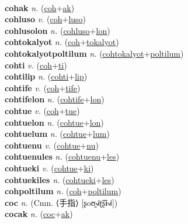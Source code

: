  \label{coh} \\
\textbf{cohak} \textit{n.} (\hyperref[coh]{coh}+\hyperref[ak]{ak})
 \label{cohak} \\
\textbf{cohluso} \textit{v.} (\hyperref[coh]{coh}+\hyperref[luso]{luso})
 \label{cohluso} \\
\textbf{cohlusolon} \textit{n.} (\hyperref[cohluso]{cohluso}+\hyperref[lon]{lon})
 \label{cohlusolon} \\
\textbf{cohtokalyot} \textit{n.} (\hyperref[coh]{coh}+\hyperref[tokalyot]{tokalyot})
 \label{cohtokalyot} \\
\textbf{cohtokalyotpoltilum} \textit{n.} (\hyperref[cohtokalyot]{cohtokalyot}+\hyperref[poltilum]{poltilum})
 \label{cohtokalyotpoltilum} \\
\textbf{cohti} \textit{v.} (\hyperref[coh]{coh}+\hyperref[ti]{ti})
 \label{cohti} \\
\textbf{cohtilip} \textit{n.} (\hyperref[cohti]{cohti}+\hyperref[lip]{lip})
 \label{cohtilip} \\
\textbf{cohtife} \textit{v.} (\hyperref[coh]{coh}+\hyperref[tife]{tife})
 \label{cohtife} \\
\textbf{cohtifelon} \textit{n.} (\hyperref[cohtife]{cohtife}+\hyperref[lon]{lon})
 \label{cohtifelon} \\
\textbf{cohtue} \textit{v.} (\hyperref[coh]{coh}+\hyperref[tue]{tue})
 \label{cohtue} \\
\textbf{cohtuelon} \textit{n.} (\hyperref[cohtue]{cohtue}+\hyperref[lon]{lon})
 \label{cohtuelon} \\
\textbf{cohtuelum} \textit{n.} (\hyperref[cohtue]{cohtue}+\hyperref[lum]{lum})
 \label{cohtuelum} \\
\textbf{cohtuenu} \textit{v.} (\hyperref[cohtue]{cohtue}+\hyperref[nu]{nu})
 \label{cohtuenu} \\
\textbf{cohtuenules} \textit{n.} (\hyperref[cohtuenu]{cohtuenu}+\hyperref[les]{les})
 \label{cohtuenules} \\
\textbf{cohtueki} \textit{v.} (\hyperref[cohtue]{cohtue}+\hyperref[ki]{ki})
 \label{cohtueki} \\
\textbf{cohtuekiles} \textit{n.} (\hyperref[cohtueki]{cohtueki}+\hyperref[les]{les})
 \label{cohtuekiles} \\
\textbf{cohpoltilum} \textit{n.} (\hyperref[coh]{coh}+\hyperref[poltilum]{poltilum})
 \label{cohpoltilum} \\
\textbf{coc} \textit{n.} (Cmn. ⟨手指⟩ [ʂoʊ̯˧˩˧ʈ͡ʂɨ˧˩˧])
 \label{coc} \\
\textbf{cocak} \textit{n.} (\hyperref[coc]{coc}+\hyperref[ak]{ak})
